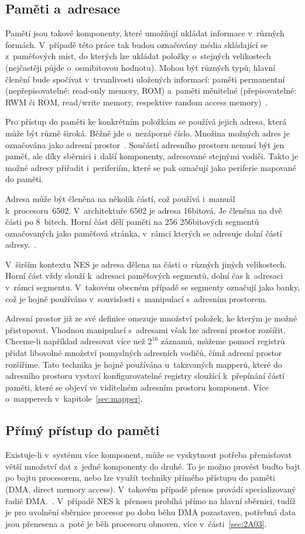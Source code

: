 \subsection{Paměti a~adresace}
Pamětí jsou takové komponenty, které umožňují ukládat informace v~různých formách. V~případě této práce tak budou označovány média skládající se z~paměťových míst, do kterých lze ukládat položky o~stejných velikostech (nejčastěji půjde o~osmibitovou hodnotu).  Mohou být různých typů; hlavní členění bude spočívat v~trvanlivosti uložených informací: paměti permanentní (nepřepisovatelné: read-only memory, ROM) a~paměti měnitelné (přepisovatelné: RWM či ROM, read/write memory, respektive random access memory)~\cite{Pluhacek1995:plp}.

Pro přístup do paměti ke konkrétním položkám se používá jejich adresa, která může být různě široká.  Běžně jde o~nezáporné číslo. Množina možných adres je označována jako adresní prostor~\cite{Pluhacek1995:plp}. Součástí adresního prostoru nemusí být jen paměť, ale díky sběrnici i~další komponenty, adresované stejnými vodiči. Takto je možné adresy přiřadit i~periferiím, které se pak označují jako periferie mapované do paměti.

Adresa může být členěna na několik částí, což používá i~manuál k~procesoru~6502. V~architektuře 6502 je adresa 16bitová. Je členěna na dvě části po 8~bitech. Horní část dělí paměti na 256 256bitových segmentů označovaných jako paměťová stránka, v~rámci kterých se adresuje dolní částí adresy.~\cite{mos:hw-manual}.

V~širším kontextu NES je adresa dělena na části o~různých jiných velikostech. Horní část vždy slouží k~adresaci paměťových segmentů, dolní čas k~adresaci v~rámci segmentu. V~takovém obecném případě se segmenty označují jako banky, což je hojně používáno v~souvislosti s~manipulací s~adresním prostorem.

Adresní prostor již ze své definice omezuje množství položek, ke kterým je možné přistupovat. Vhodnou manipulací s~adresami však lze adresní prostor rozšířit. Chceme-li například adresovat více než $2^{16}$ záznamů, můžeme pomocí registrů přidat libovolné množství pomyslných adresních vodičů, čímž adresní prostor rozšíříme. Tato technika je hojně používána u~takzvaných mapperů, které do adresního prostoru vystaví konfigurovatelné registry sloužící k~přepínání částí paměti, které se objeví ve viditelném adresním prostoru komponent. Více o~mapperech v~kapitole~\ref{sec:mapper}.

\subsection{Přímý přístup do paměti}
Existuje-li v~systému více komponent, může se vyskytnout potřeba přemisťovat větší množství dat z~jedné komponenty do druhé.  To je možno provést buďto bajt po bajtu procesorem, nebo lze využít techniky přímého přístupu do paměti (DMA, direct memory access). V~takovém případě přenos provádí specializovaný řadič DMA.~\cite{mos:hw-manual}. V~případě NES k~přenosu probíhá přímo na hlavní sběrnici, tudíž je pro uvolnění sběrnice procesor po dobu běhu DMA pozastaven, potřebná data jsou přenesena a~poté je běh procesoru obnoven, více v~části~\ref{sec:2A03}.

